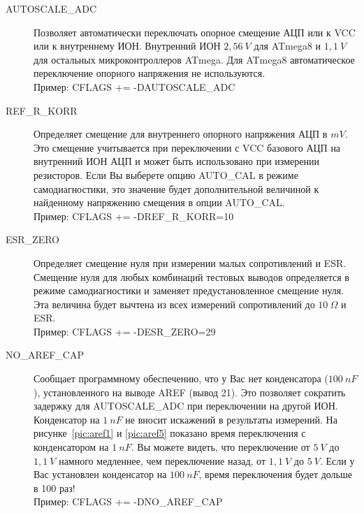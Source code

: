 \begin{description}
  \item[AUTOSCALE\_ADC] Позволяет автоматически переключать опорное смещение АЦП или к VCC или к внутреннему ИОН. 
Внутренний ИОН \(2,56~V\) для ATmega8 и \(1,1~V\) для остальных микроконтроллеров ATmega.
Для ATmega8 автоматическое переключение опорного напряжения не используются.\\
Пример: CFLAGS += -DAUTOSCALE\_ADC

  \item[REF\_R\_KORR] Определяет смещение для внутреннего опорного напряжения АЦП в \(mV\). Это смещение учитывается 
при переключении с VCC базового АЦП на внутренний ИОН АЦП и может быть использовано при измерении резисторов. 
Если Вы выберете опцию AUTO\_CAL в режиме самодиагностики, это значение будет дополнительной величиной к найденному 
напряжению смещения в  опции AUTO\_CAL.\\
Пример: CFLAGS += -DREF\_R\_KORR=10

  \item[ESR\_ZERO] Определяет смещение нуля при измерении малых сопротивлений и ESR.
Смещение нуля для любых комбинаций тестовых выводов определяется в режиме самодиагностики
и заменяет предустановленное смещение нуля.
Эта величина будет вычтена из всех измерений сопротивлений до \(10~\Omega\) и ESR.\\
Пример: CFLAGS += -DESR\_ZERO=29

  \item[NO\_AREF\_CAP] Сообщает программному обеспечению, что у Вас нет конденсатора (\(100~nF\)), установленного 
на выводе AREF (вывод 21). Это позволяет сократить задержку для AUTOSCALE\_ADC при переключении на другой ИОН. 
Конденсатор на \(1~nF\) не вносит искажений в результаты измерений. На рисунке~\ref{pic:aref1} и \ref{pic:aref5} 
показано время переключения  с конденсатором на \(1~nF\).
Вы можете видеть, что переключение от \(5~V\) до \(1,1~V\) намного медленнее, чем переключение назад, от \(1,1~V\) 
до \(5~V\). 
Если у Вас установлен конденсатор на \(100~nF\), время переключения будет дольше в 100 раз!\\
Пример: CFLAGS += -DNO\_AREF\_CAP


\end{description}
